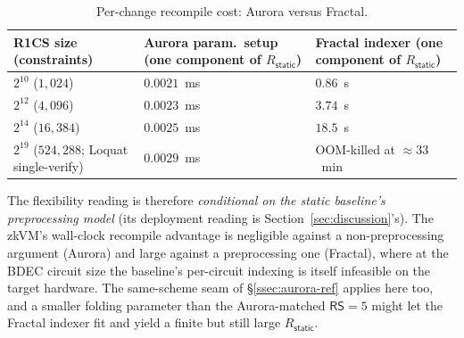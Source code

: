 \begin{table}[H]
\centering
\small
\begin{tabularx}{\textwidth}{@{}l Y Y@{}}
\toprule
R1CS size (constraints) & Aurora param.\ setup (one component of $R_{\mathsf{static}}$) & Fractal indexer (one component of $R_{\mathsf{static}}$) \\
\midrule
$2^{10}$ ($1{,}024$)          & $0.0021$~ms & $0.86$~s \\
$2^{12}$ ($4{,}096$)          & $0.0023$~ms & $3.74$~s \\
$2^{14}$ ($16{,}384$)         & $0.0025$~ms & $18.5$~s \\
$2^{19}$ ($524{,}288$; Loquat single-verify) & $0.0029$~ms & OOM-killed at ${\approx}33$~min \\
\bottomrule
\end{tabularx}
\caption{Per-change recompile cost: Aurora versus Fractal.}
\label{tab:rstatic-fractal}
\end{table}

\noindent The flexibility reading is therefore \emph{conditional on the static baseline's preprocessing model} (its deployment reading is Section~\ref{sec:discussion}'s). The zkVM's wall-clock recompile advantage is negligible against a non-preprocessing argument (Aurora) and large against a preprocessing one (Fractal), where at the BDEC circuit size the baseline's per-circuit indexing is itself infeasible on the target hardware. The same-scheme seam of \S\ref{ssec:aurora-ref} applies here too, and a smaller folding parameter than the Aurora-matched $\mathsf{RS}=5$ might let the Fractal indexer fit and yield a finite but still large $R_{\mathsf{static}}$.

